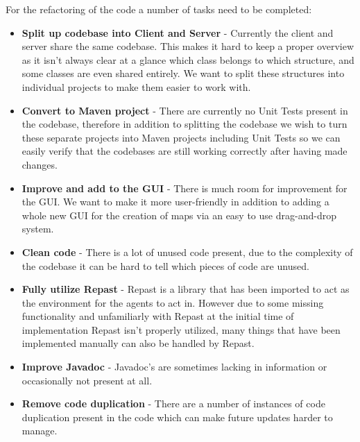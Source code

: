 For the refactoring of the code a number of tasks need to be completed:
\begin{itemize}
  \item
  \textbf{Split up codebase into Client and Server} - Currently the client and
  server share the same codebase. This makes it hard to keep a proper overview as
  it isn't always clear at a glance which class belongs to which structure, and
  some classes are even shared entirely. We want to split these structures into
  individual projects to make them easier to work with.
  \item
  \textbf{Convert to Maven project} - There are currently no Unit Tests present
  in the codebase, therefore in addition to splitting the codebase we wish to
  turn these separate projects into Maven projects including Unit Tests so we can
  easily verify that the codebases are still working correctly after having made
  changes.
  \item
  \textbf{Improve and add to the GUI} - There is much room for improvement for
  the GUI. We want to make it more user-friendly in addition to adding a whole
  new GUI for the creation of maps via an easy to use drag-and-drop system.
  \item
  \textbf{Clean code} - There is a lot of unused code present, due to the
  complexity of the codebase it can be hard to tell which pieces of code are
  unused.
  \item
  \textbf{Fully utilize Repast} - Repast is a library that has been imported to
  act as the environment for the agents to act in. However due to some missing
  functionality and unfamiliarly with Repast at the initial time of implementation
  Repast isn't properly utilized, many things that have been implemented manually
  can also be handled by Repast.
  \item
  \textbf{Improve Javadoc} - Javadoc's are sometimes lacking in information or
  occasionally not present at all.
  \item
  \textbf{Remove code duplication} - There are a number of instances of code
  duplication present in the code which can make future updates harder to manage.
\end{itemize}
